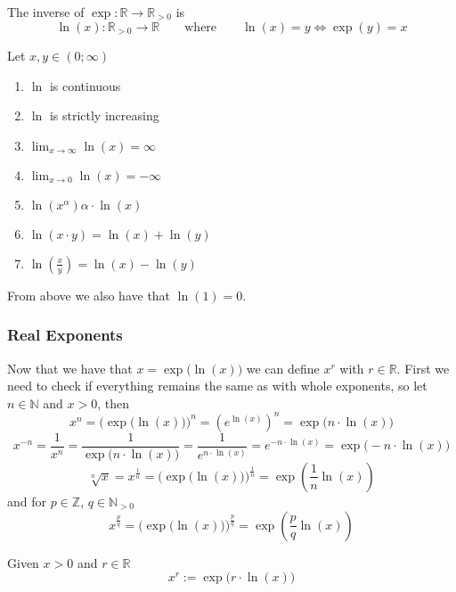 \begin{definition}[Logarithm]
   The inverse of \(\exp: \mathbb{R} \to \mathbb{R}_{>0}\) is
   \[\ln(x): \mathbb{R}_{>0} \to \mathbb{R} \qquad\text{where}\qquad \ln(x) = y \iff \exp(y) = x\]
\end{definition}

\begin{proposition}[Properties]
   Let \(x, y \in (0; \infty)\)
   \begin{enumerate}[label=\roman*, align=Center]
      \item \(\ln\) is continuous
      \item \(\ln\) is strictly increasing
      \item \(\lim_{x \to \infty} \ln(x) = \infty\)
      \item \(\lim_{x \to 0} \ln(x) = -\infty\)
      \item \(\ln(x^\alpha) \alpha \cdot \ln(x)\)
      \item \(\ln(x \cdot y) = \ln(x) + \ln(y)\)
      \item \(\ln\left(\frac{x}{y}\right) = \ln(x) - \ln(y)\)
   \end{enumerate}
\end{proposition}
\begin{remark}
   From above we also have that \(\ln(1) = 0\).
\end{remark}

\subsubsection{Real Exponents}
Now that we have that \(x = \exp\big(\ln(x)\big)\) we can define \(x^r\) with \(r \in \mathbb{R}\).
First we need to check if everything remains the same as with whole exponents, so let \(n \in \mathbb{N}\) and \(x > 0\), then
\[x^n = \Big(\exp\big(\ln(x)\big)\Big)^n = \left(e^{\ln(x)}\right)^n = \exp\big(n \cdot \ln(x)\big)\]
\[x^{-n} = \frac{1}{x^n} = \frac{1}{\exp\big(n \cdot \ln(x)\big)} = \frac{1}{e^{n \cdot \ln(x)}} = e^{-n \cdot \ln(x)} = \exp\big(-n \cdot \ln(x)\big)\]
\[\sqrt[n]{x} = x^{\frac{1}{n}} = \Big(\exp\big(\ln(x)\big)\Big)^\frac{1}{n} = \exp\left(\frac{1}{n} \ln(x)\right)\]
and for \(p \in \mathbb{Z}\), \(q \in \mathbb{N}_{>0}\)
\[x^\frac{p}{q} = \Big(\exp\big(\ln(x)\big)\Big)^\frac{p}{q} = \exp\left(\frac{p}{q} \ln(x)\right)\]

\begin{definition}\label{def:real_exponents}
   Given \(x > 0\) and \(r \in \mathbb{R}\)
   \[x^r := \exp\big(r \cdot \ln(x)\big)\]
\end{definition}

